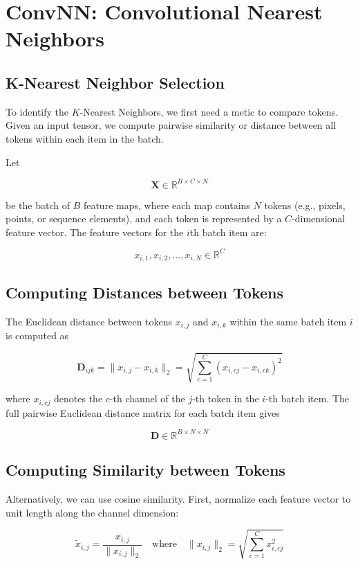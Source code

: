 \documentclass{article}
\begin{document}
\section{ConvNN: Convolutional Nearest Neighbors}
\label{gen_inst}

\subsection{K-Nearest Neighbor Selection}
To identify the \(K\)-Nearest Neighbors, we first need a metic to compare tokens. Given an input tensor, we compute pairwise similarity or distance between all tokens within each item in the batch. 

Let

\[
    \mathbf{X} \in \mathbb{R}^{B \times C \times N}
\]

be the batch of \(B\) feature maps, where each map contains \(N\) tokens (e.g., pixels, points, or sequence elements), and each token is represented by a \(C\)-dimensional feature vector. The feature vectors for the \(i\)th batch item are: 

\[
    x_{i,1}, x_{i,2}, \ldots , x_{i, N} \in \mathbb{R}^C 
\]

\subsection*{Computing Distances between Tokens}

The Euclidean distance between tokens \(x_{i,j}\) and \(x_{i,k}\) within the same batch item \(i\) is computed as

\[
    \mathbf{D}_{ijk} = \|x_{i,j} - x_{i,k}\|_2 = \sqrt{\sum_{c=1}^C (x_{i,cj} - x_{i,ck})^2}
\]

where \(x_{i,cj}\) denotes the \(c\)-th channel of the \(j\)-th token in the \(i\)-th batch item. The full pairwise Euclidean distance matrix for each batch item gives

\[
    \mathbf{D} \in \mathbb{R}^{B \times N \times N}
\]

\subsection*{Computing Similarity between Tokens}

Alternatively, we can use cosine similarity. First, normalize each feature vector to unit length along the channel dimension: 

\[
    \tilde{x}_{i,j} = \frac{x_{i,j}}{\|x_{i,j}\|_2} \quad \text{where} \quad \|x_{i,j}\|_2 = \sqrt{\sum_{c=1}^C x_{i,cj}^2}
\]
\end{document}
